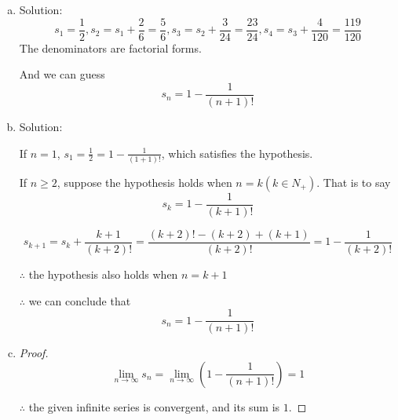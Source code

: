 \documentclass{article}
\begin{document}
    \begin{enumerate}[(a)]
        \item Solution:
        $$s_1 = \frac{1}{2}, s_2 = s_1 + \frac{2}{6} = \frac 5 6, s_3 = s_2 + \frac{3}{24} = \frac{23}{24}, s_4 = s_3 + \frac{4}{120} = \frac{119}{120}$$
        The denominators are factorial forms.

        And we can guess $$s_n = 1 - \frac{1}{(n+1)!}$$
        \item Solution:

        If $n=1$, $s_1 = \frac 1 2 = 1 - \frac{1}{(1 + 1)!}$, which satisfies the hypothesis.

        If $n\geq 2$, suppose the hypothesis holds when $n=k(k\in N_+)$. That is to say $$s_k = 1 - \frac{1}{(k + 1)!}$$

        $$s_{k+1} = s_k + \frac{k+1}{(k+2)!} = \frac{(k+2)! - (k+2) + (k+1)}{(k+2)!} = 1 - \frac{1}{(k+2)!}$$

        $\therefore$ the hypothesis also holds when $n=k+1$

        $\therefore$ we can conclude that $$s_n = 1 - \frac{1}{(n+1)!}$$

        \item \begin{proof}
            $$\lim_{n \to \infty} s_n = \lim_{n\to \infty}(1 - \frac{1}{(n+1)!}) = 1$$

            $\therefore$ the given infinite series is convergent, and its sum is $1$.
        \end{proof}
    \end{enumerate}
\end{document}
